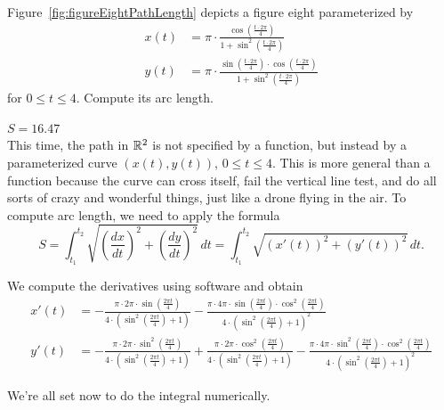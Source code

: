\begin{example}
\label{ex:figureEight}
Figure~\ref{fig:figureEightPathLength} depicts a figure eight parameterized by 
\begin{align*}
    x(t) &= \pi \cdot \frac{\cos\left(\frac{t \cdot 2\pi}{4}\right)}{1 + \sin^2\left(\frac{t \cdot 2\pi}{4}\right)} \\[1em]
    y(t) & = \pi \cdot \frac{\sin\left(\frac{t \cdot 2\pi}{4}\right) \cdot \cos\left(\frac{t \cdot 2\pi}{4}\right)}{1 + \sin^2\left(\frac{t \cdot 2\pi}{4}\right)}
\end{align*}
for $0 \le t \le 4$. Compute its arc length.    
\end{example}

\solution \Ans $S = 16.47$\\

This time, the path in $\mathbb R^2$ is not specified by a function, but instead by a parameterized curve $(x(t), y(t))$,  $0 \le t \le 4$. This is more general than a function because the curve can cross itself, fail the vertical line test, and do all sorts of crazy and wonderful things, just like a drone flying in the air. To compute arc length, we need to apply the formula 
$$
S = \int_{t_1}^{t_2} \sqrt{\left(\frac{dx}{dt}\right)^2 + \left(\frac{dy}{dt}\right)^2} \, dt = \int_{t_1}^{t_2} \sqrt{ \left( {x}'(t) \right)^2 + \left({y}'(t)\right)^2 } \, dt.$$

We compute the derivatives using software and obtain
\begin{align*}
    {x}'(t) &= -\frac{\pi \cdot 2\pi \cdot \sin\left(\frac{2\pi t}{4}\right)}{4 \cdot \left(\sin^2\left(\frac{2\pi t}{4}\right) + 1\right)} - \frac{\pi \cdot 4\pi \cdot \sin\left(\frac{2\pi t}{4}\right) \cdot \cos^2\left(\frac{2\pi t}{4}\right)}{4 \cdot \left(\sin^2\left(\frac{2\pi t}{4}\right) + 1\right)^2}\\[1em]
   {y}'(t) & = -\frac{\pi \cdot 2\pi \cdot \sin^2\left(\frac{2\pi t}{4}\right)}{4 \cdot \left(\sin^2\left(\frac{2\pi t}{4}\right) + 1\right)} + \frac{\pi \cdot 2\pi \cdot \cos^2\left(\frac{2\pi t}{4}\right)}{4 \cdot \left(\sin^2\left(\frac{2\pi t}{4}\right) + 1\right)} - \frac{\pi \cdot 4\pi \cdot \sin^2\left(\frac{2\pi t}{4}\right) \cdot \cos^2\left(\frac{2\pi t}{4}\right)}{4 \cdot \left(\sin^2\left(\frac{2\pi t}{4}\right) + 1\right)^2}
\end{align*}

We're all set now to do the integral numerically.

